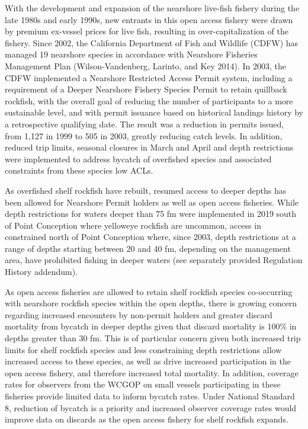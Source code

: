 \documentclass[11pt,
  english,
  a4paper,
]{article}
\begin{document}
With the development and expansion of the nearshore live-fish fishery during the late 1980s and early 1990s, new entrants in this open access fishery were drawn by premium ex-vessel prices for live fish, resulting in over-capitalization of the fishery. Since 2002, the California Department of Fish and Wildlife (CDFW) has managed 19 nearshore species in accordance with Nearshore Fisheries Management Plan {(Wilson-Vandenberg, Larinto, and Key 2014)\leavevmode\tagmcend\tagstructend}. In 2003, the CDFW implemented a Nearshore Restricted Access Permit system, including a requirement of a Deeper Nearshore Fishery Species Permit to retain quillback rockfish, with the overall goal of reducing the number of participants to a more sustainable level, and with permit issuance based on historical landings history by a retrospective qualifying date. The result was a reduction in permits issued, from 1,127 in 1999 to 505 in 2003, greatly reducing catch levels. In addition, reduced trip limits, seasonal closures in March and April and depth restrictions were implemented to address bycatch of overfished species and associated constraints from these species low ACLs.

\leavevmode\tagmcend\tagstructend\par


As overfished shelf rockfish have rebuilt, resumed access to deeper depths has been allowed for Nearshore Permit holders as well as open access fisheries. While depth restrictions for waters deeper than 75 fm were implemented in 2019 south of Point Conception where yelloweye rockfish are uncommon, access in constrained north of Point Conception where, since 2003, depth restrictions at a range of depths starting between 20 and 40 fm, depending on the management area, have prohibited fishing in deeper waters (see separately provided Regulation History addendum).

\leavevmode\tagmcend\tagstructend\par


As open access fisheries are allowed to retain shelf rockfish species co-occurring with nearshore rockfish species within the open depths, there is growing concern regarding increased encounters by non-permit holders and greater discard mortality from bycatch in deeper depths given that discard mortality is 100\% in depths greater than 30 fm. This is of particular concern given both increased trip limits for shelf rockfish species and less constraining depth restrictions allow increased access to these species, as well as drive increased participation in the open access fishery, and therefore increased total mortality. In addition, coverage rates for observers from the WCGOP on small vessels participating in these fisheries provide limited data to inform bycatch rates. Under National Standard 8, reduction of bycatch is a priority and increased observer coverage rates would improve data on discards as the open access fishery for shelf rockfish expands.
\end{document}
